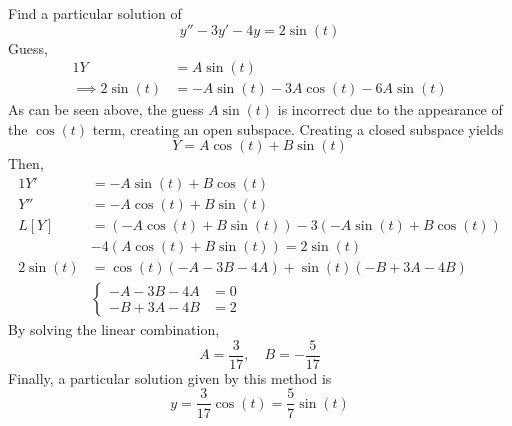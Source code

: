 \documentclass[diffeq.tex]{subfiles}
\begin{document}
    \begin{example}
        Find a particular solution of
        \begin{equation}
            y'' - 3y' - 4y = 2\sin(t)
        \end{equation}
        Guess,
        \begin{alignat}{1}
            Y &= A\sin(t)\\
            \implies  2\sin(t) &= -A\sin(t)-3A\cos(t)-6A\sin(t)
        \end{alignat}
        As can be seen above, the guess $A\sin(t)$ is incorrect due to the appearance of the $\cos(t)$ term, creating an open subspace. Creating a closed subspace yields
        \begin{equation}
            Y = A\cos(t) + B\sin(t)
        \end{equation}
        Then,
        \begin{alignat}{1}
            Y' &= -A\sin(t) + B\cos(t)\\
            Y'' &= -A\cos(t) + B\sin(t)\\
            L[Y] &= (-A\cos(t) + B\sin(t)) -3(-A\sin(t) + B\cos(t))\\
            &-4(A\cos(t) + B\sin(t)) = 2\sin(t)\\
            2\sin(t) &=\cos(t)(-A-3B-4A) + \sin(t)(-B+3A-4B)\\
            &\begin{cases}
                -A-3B-4A &= 0\\
                -B+3A-4B &= 2
            \end{cases}
        \end{alignat}
        By solving the linear combination,
        \begin{equation}
            A = \frac{3}{17},\quad B = -\frac{5}{17}
        \end{equation}
        Finally, a particular solution given by this method is
        \begin{equation}
            y = \frac{3}{17}\cos(t) = \frac{5}{7}\sin(t)
        \end{equation}
    \end{example}
    \np
\end{document}
